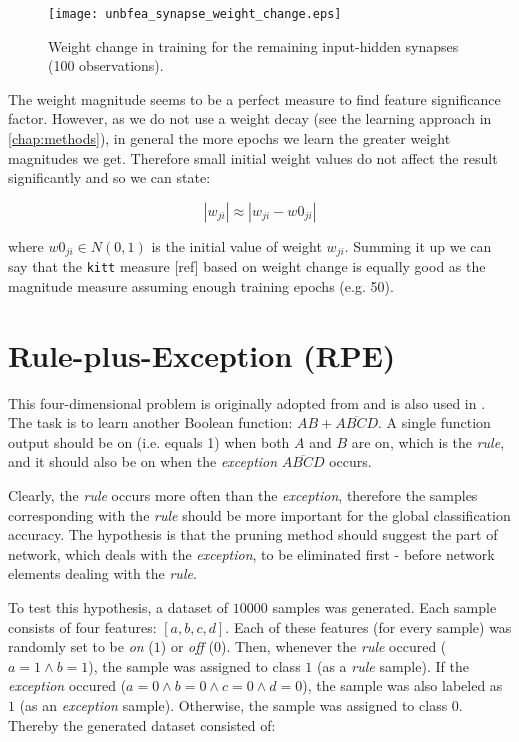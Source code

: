 \begin{figure}[H]
\centering
\texttt{[image: unbfea\_synapse\_weight\_change.eps]}
\caption{Weight change in training for the remaining input-hidden synapses (100 observations).}
\label{fig:examples:unbfea_synapse_weight_change}
\end{figure}

The weight magnitude seems to be a perfect measure to find feature significance factor. However, as we do not use a weight decay (see the learning approach in \cref{chap:methods}), in general the more epochs we learn the greater weight magnitudes we get. Therefore small initial weight values do not affect the result significantly and so we can state:

\begin{equation}
|w_{ji}| \approx |w_{ji} - w0_{ji}|
\end{equation}

where $ w0_{ji} \in N(0,1) $ is the initial value of weight $ w_{ji} $. Summing it up we can say that the \texttt{kitt} measure [ref] based on weight change is equally good as the magnitude measure assuming enough training epochs (e.g. 50).

\section{Rule-plus-Exception (RPE)} \label{sec:example_rpe}
This four-dimensional problem is originally adopted from \citep{mozer_smolensky} and is also used in \citep{karnin}. The task is to learn another Boolean function: $ AB+\overline{ABCD} $. A single function output should be on (i.e. equals 1) when both $ A $ and $ B $ are on, which is the \textit{rule}, and it should also be on when the \textit{exception} $ \overline{ABCD} $ occurs.

Clearly, the \textit{rule} occurs more often than the \textit{exception}, therefore the samples corresponding with the \textit{rule} should be more important for the global classification accuracy. The hypothesis is that the pruning method should suggest the part of network, which deals with the \textit{exception}, to be eliminated first - before network elements dealing with the \textit{rule}.

To test this hypothesis, a dataset of $ 10000 $ samples was generated. Each sample consists of four features: $ [a, b, c, d] $. Each of these features (for every sample) was randomly set to be \textit{on} ($ 1 $) or \textit{off} ($ 0 $). Then, whenever the \textit{rule} occured ($ a = 1 \wedge b = 1 $), the sample was assigned to class $ 1 $ (as a \textit{rule} sample). If the \textit{exception} occured ($ a = 0 \wedge b = 0 \wedge c = 0 \wedge d = 0 $), the sample was also labeled as $ 1 $ (as an \textit{exception} sample). Otherwise, the sample was assigned to class $ 0 $. Thereby the generated dataset consisted of:

